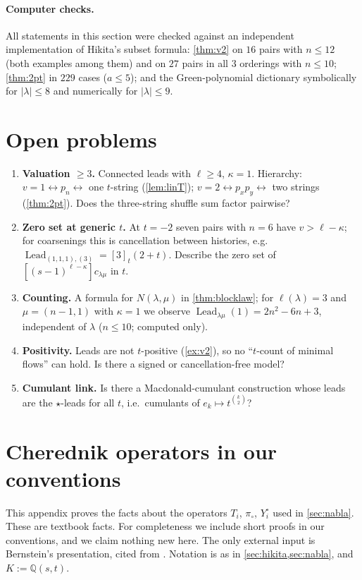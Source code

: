 \documentclass[11pt]{amsart}
\theoremstyle{definition}
\theoremstyle{remark}
\numberwithin{equation}{section}
\newcommand{\Lead}{\operatorname{Lead}}
\newcommand{\val}{v}
\begin{document}
\paragraph{Computer checks.} All statements in this section were checked against an independent implementation of Hikita's subset formula: \cref{thm:v2} on $16$ pairs with $n\le12$ (both examples among them) and on $27$ pairs in all $3$ orderings with $n\le10$; \cref{thm:2pt} in $229$ cases ($a\le5$); and the Green-polynomial dictionary symbolically for $|\lambda|\le8$ and numerically for $|\lambda|\le9$.


\section{Open problems}\label{sec:open}
\begin{enumerate}
  \item \textbf{Valuation $\ge3$.} Connected leads with $\ell\ge4$, $\kappa=1$. Hierarchy: $v=1\leftrightarrow p_n\leftrightarrow$ one $t$-string (\cref{lem:linT}); $v=2\leftrightarrow p_xp_y\leftrightarrow$ two strings (\cref{thm:2pt}). Does the three-string shuffle sum factor pairwise?
  \item \textbf{Zero set at generic $t$.} At $t=-2$ seven pairs with $n=6$ have $\val>\ell-\kappa$; for coarsenings this is cancellation between histories, e.g.\ $\Lead_{(1,1,1),(3)}=[3]_t(2+t)$. Describe the zero set of $[(s-1)^{\ell-\kappa}]c_{\lambda\mu}$ in $t$.
  \item \textbf{Counting.} A formula for $N(\lambda,\mu)$ in \cref{thm:blocklaw}; for $\ell(\lambda)=3$ and $\mu=(n-1,1)$ with $\kappa=1$ we observe $\Lead_{\lambda\mu}(1)=2n^2-6n+3$, independent of $\lambda$ ($n\le10$; computed only).
  \item \textbf{Positivity.} Leads are not $t$-positive (\cref{ex:v2}), so no ``$t$-count of minimal flows'' can hold. Is there a signed or cancellation-free model?
  \item \textbf{Cumulant link.} Is there a Macdonald-cumulant construction whose leads are the $\star$-leads for all $t$, i.e.\ cumulants of $e_k\mapsto t^{\binom k2}$?
\end{enumerate}

\appendix
\section{Cherednik operators in our conventions}\label{app:cherednik}
This appendix proves the facts about the operators $T_i$, $\pi_\circ$, $Y^\circ_i$ used in \cref{sec:nabla}. These are textbook facts. For completeness we include short proofs in our conventions, and we claim nothing new here. The only external input is Bernstein's presentation, cited from \cite[Thm.~4.2]{Haiman06}. Notation is as in \cref{sec:hikita,sec:nabla}, and $K:=\mathbb{Q}(s,t)$.
\end{document}
